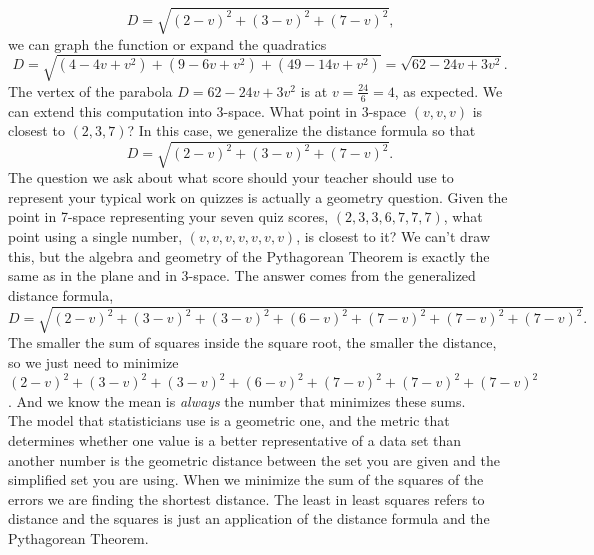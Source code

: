 \documentclass[10pt,]{book}
\theoremstyle{ptxdefinitionnotitle}
\theoremstyle{ptxdefinitiontitle}
\numberwithin{equation}{section}
\begin{document}
\begin{example}[{.}]
\begin{equation*}
D = \sqrt {{{\left( {2 - v} \right)}^2} + {{\left( {3 - v} \right)}^2} + {{\left( {7 - v} \right)}^2}}\text{,}
\end{equation*}
we can graph the function or expand the quadratics%
\begin{equation*}
D = \sqrt {\left( {4 - 4v + {v^2}} \right) + \left( {9 - 6v + {v^2}} \right) + \left( {49 - 14v + {v^2}} \right)}  = \sqrt {62 - 24v + 3{v^2}}\text{.}
\end{equation*}
The vertex of the parabola \(D = 62 - 24v + 3{v^2}\) is at \(v = \frac{{24}}{6} = 4\), as expected. We can extend this computation into 3-space. What point in 3-space \(\left( v, v, v \right)\) is closest to  \(\left( 2, 3, 7 \right)\)? In this case, we generalize the distance formula so that%
\begin{equation*}
D = \sqrt {{{\left( {2 - v} \right)}^2} + {{\left( {3 - v} \right)}^2} + {{\left( {7 - v} \right)}^2}}\text{.}
\end{equation*}
The question we ask about what score should your teacher should use to represent your typical work on quizzes is actually a geometry question. Given the point in 7-space representing your seven quiz scores, \(\left( {2, 3, 3, 6, 7, 7, 7} \right)\), what point using a single number, \(\left( {v, v, v, v, v, v, v} \right)\), is closest to it? We can’t draw this, but the algebra and geometry of the Pythagorean Theorem is exactly the same as in the plane and in 3-space. The answer comes from the generalized distance formula,%
\begin{equation*}
D = \sqrt {{{\left( {2 - v} \right)}^2} + {{\left( {3 - v} \right)}^2} + {{\left( {3 - v} \right)}^2} + {{\left( {6 - v} \right)}^2} + {{\left( {7 - v} \right)}^2} + {{\left( {7 - v} \right)}^2} + {{\left( {7 - v} \right)}^2}}\text{.}
\end{equation*}
The smaller the sum of squares inside the square root, the smaller the distance, so we just need to minimize \({\left( {2 - v} \right)^2} + {\left( {3 - v} \right)^2} + {\left( {3 - v} \right)^2} + {\left( {6 - v} \right)^2} + {\left( {7 - v} \right)^2} + {\left( {7 - v} \right)^2} + {\left( {7 - v} \right)^2}\). And we know the mean is \emph{always} the number that minimizes these sums. \\ The model that statisticians use is a geometric one, and the metric that determines whether one value is a better representative of a data set than another number is the geometric distance between the set you are given and the simplified set you are using. When we minimize the sum of the squares of the errors we are finding the shortest distance. The least in least squares refers to distance and the squares is just an application of the distance formula and the Pythagorean Theorem.%
\end{example}
\typeout{************************************************}
\typeout{************************************************}
\end{document}
